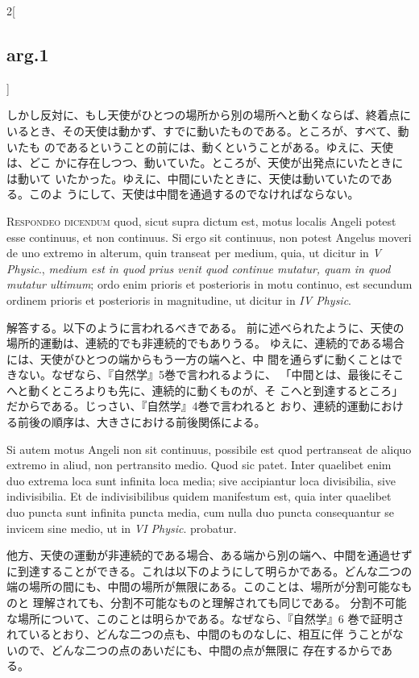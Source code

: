 \documentclass[paper=a4paper,fontsize=10pt,jafontsize=9pt,titlepage]{jlreq}
\begin{document}
\begin{paracol}{2}[\subsection{arg.1}]
\switchcolumn

しかし反対に、もし天使がひとつの場所から別の場所へと動くならば、終着点に
 いるとき、その天使は動かず、すでに動いたものである。ところが、すべて、動いたも
 のであるということの前には、動くということがある。ゆえに、天使は、どこ
 かに存在しつつ、動いていた。ところが、天使が出発点にいたときには動いて
 いたかった。ゆえに、中間にいたときに、天使は動いていたのである。このよ
 うにして、天使は中間を通過するのでなければならない。


{\scshape Respondeo dicendum} quod, sicut supra dictum
est, motus localis Angeli potest esse continuus, et non continuus. Si
ergo sit continuus, non potest Angelus moveri de uno extremo in alterum,
quin transeat per medium, quia, ut dicitur in {\itshape V Physic}., {\itshape medium est in
quod prius venit quod continue mutatur, quam in quod mutatur ultimum};
ordo enim prioris et posterioris in motu continuo, est secundum ordinem
prioris et posterioris in magnitudine, ut dicitur in {\itshape IV
 Physic}.

\switchcolumn

解答する。以下のように言われるべきである。
前に述べられたように、天使の場所的運動は、連続的でも非連続的でもありうる。
 ゆえに、連続的である場合には、天使がひとつの端からもう一方の端へと、中
 間を通らずに動くことはできない。なぜなら、『自然学』5巻で言われるように、
 「中間とは、最後にそこへと動くところよりも先に、連続的に動くものが、そ
 こへと到達するところ」だからである。じっさい、『自然学』4巻で言われると
 おり、連続的運動における前後の順序は、大きさにおける前後関係による。

\switchcolumn*

Si autem
motus Angeli non sit continuus, possibile est quod pertranseat de aliquo
extremo in aliud, non pertransito medio. Quod sic patet. Inter quaelibet
enim duo extrema loca sunt infinita loca media; sive accipiantur loca
divisibilia, sive indivisibilia. Et de indivisibilibus quidem manifestum
est, quia inter quaelibet duo puncta sunt infinita puncta media, cum
nulla duo puncta consequantur se invicem sine medio, ut in {\itshape VI
Physic}. probatur.

\switchcolumn

他方、天使の運動が非連続的である場合、ある端から別の端へ、中間を通過せず
に到達することができる。これは以下のようにして明らかである。どんな二つの
端の場所の間にも、中間の場所が無限にある。このことは、場所が分割可能なものと
 理解されても、分割不可能なものと理解されても同じである。
分割不可能な場所について、このことは明らかである。なぜなら、『自然学』6
 巻で証明されているとおり、どんな二つの点も、中間のものなしに、相互に伴
 うことがないので、どんな二つの点のあいだにも、中間の点が無限に
 存在するからである。


\end{paracol}
\end{document}
